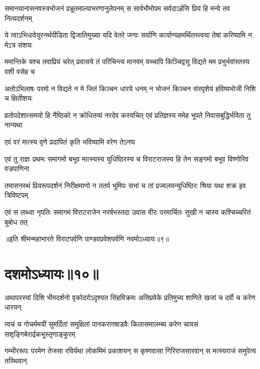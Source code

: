\fourlineindentedshloka
{समानयानासनवस्त्रभोजनं}
{प्रभ्रूतमाल्याभरणानुलेपनम्}
{स सार्वभौमोपम सर्वदाऽर्हसि}
{प्रियं हि मन्ये तव नित्यदर्शनम्}


\fourlineindentedshloka
{ये त्वाऽभिधावेयुरनर्थपीडिता}
{द्विजातिमुख्या यदि वेतरे जनाः}
{सर्वाणि कार्याण्यहमर्थितस्त्वया}
{तेषां करिष्यामि न मेऽत्र संशयः}


\fourlineindentedshloka
{ममान्तिके यश्च तवाप्रियं चरेत्}
{प्रवासये तं परिचिन्त्य मानवम्}
{यच्चापि किञ्चिद्वसु विद्यते मम}
{प्रभुर्भवांस्तस्य वशी वसेह च}




\fourlineindentedshloka
{अतोऽभिलाषः परमो न विद्यते}
{न मे जितं किञ्चन धारये धनम्}
{न भोजनं किञ्चन संस्पृशेयं}
{हविष्यभोजी निशि च क्षितीशयः}


\fourlineindentedshloka
{व्रतोपदेशात्समयो हि नैष्ठिको}
{न क्रोधितव्यं नरदेव कस्यचित्}
{एवं प्रतिज्ञस्य ममेह भूपते}
{निवासबुद्धिर्भविता तु नान्यथा}


\onelineindentedshloka
{एवं वरं मात्स्य वृणे प्रदापितं}
{कृति भविष्यामि वरेण तेऽनघ}



\fourlineindentedshloka
{एवं तु राज्ञः प्रथमः समागमो}
{बभूव मात्स्यस्य युधिष्ठिरस्य च}
{विराटराजस्य हि तेन सङ्गमो}
{बभूव विष्णोरिव वज्रपाणिना}


\fourlineindentedshloka
{तमासनस्थं प्रियरूपदर्शनं}
{निरीक्षमाणो न ततर्प भूमिपः}
{सभां च तां प्रज्वलयन्युधिष्ठिरः}
{श्रिया यथा शक्र इव त्रिविष्टपम्}


\fourlineindentedshloka
{एवं स लब्ध्वा नृपतिः समागमं}
{विराटराजेन नरर्षभस्तदा}
{उवास वीरः परमार्चितः सुखी}
{न चास्य कश्चिच्चरितं बुबोध तत्}

॥इति श्रीमन्महाभारते विराटपर्वणि पाण्डवप्रवेशपर्वणि नवमोऽध्यायः॥९॥

\chapter{दशमोऽध्यायः॥१०॥}

\fourlineindentedshloka
{अथापरस्यां दिशि भीमदर्शनो}
{वृकोदरोऽदृश्यत सिंहविक्रमः}
{असिप्रवेके प्रतिमुच्य शाणिते}
{खजां च दर्वी च करेण धारयन्}


\fourlineindentedshloka
{त्वचं च गोचर्ममयीं सुमर्दितां}
{समुक्षितां पानकरागषाडवैः}
{किलासमालम्ब्य करेण चायसं}
{सशृङ्गिबेरार्द्रकभूस्तृणाङ्कुरम्}


\fourlineindentedshloka
{गम्भीररूपः परमेण तेजसा}
{रविर्यथा लोकमिमं प्रकाशयन्}
{स कृष्णवासा गिरिराजसारवान्}
{स मत्स्यराजं समुपेत्य तस्थिवान्}



